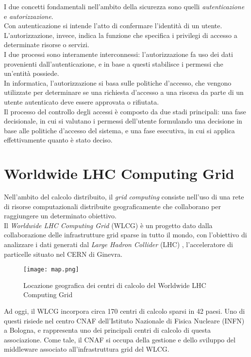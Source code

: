 I due concetti fondamentali nell'ambito della
 sicurezza sono quelli \textit{autenticazione} e \textit{autorizzazione}.
 \\ Con autenticazione si intende l'atto di confermare l'identità di un utente. 
 L'autorizzazione, invece, indica la funzione che specifica i privilegi di accesso a determinate risorse o servizi.
\\I due processi sono interamente interconnessi: l'autorizzazione fa uso dei dati provenienti 
dall'autenticazione, e in base a questi stabilisce i 
permessi che un'entità possiede.
\\ In informatica, l'autorizzazione si basa sulle politiche d'accesso, che vengono utilizzate per determinare se 
una richiesta d'accesso a una risorsa da parte di un utente autenticato deve essere approvata o rifiutata.
\\ Il processo del controllo degli accessi è composto da due stadi principali: una fase decisionale, in cui si valutano i permessi dell'utente 
 formulando una decisione in base alle politiche d'accesso del sistema,
e una fase esecutiva, in cui si applica effettivamente quanto è stato deciso. 

\section{Worldwide LHC Computing Grid}
Nell'ambito del calcolo distribuito, il \textit{grid computing} consiste 
nell'uso di una rete di risorse computazionali distribuite geograficamente che collaborano 
per raggiungere un determinato obiettivo.
\\ Il \textit{Worldwide LHC Computing Grid} (WLCG) \cite{wlcg_doc} è un progetto dato dalla collaborazione 
delle infrastrutture grid sparse in tutto il mondo, con l'obiettivo
di analizzare i dati generati dal \textit{Large Hadron Collider} (LHC) \cite{cern_lhc}, 
l'acceleratore di particelle situato nel CERN di Ginevra. 
\begin{figure}[h]
    \texttt{[image: map.png]}
    \centering
    \caption{Locazione geografica dei centri di calcolo del Worldwide LHC Computing Grid}
    \label{mappa}
\end{figure}

Ad oggi, il WLCG incorpora circa 170 centri di calcolo sparsi in 42 paesi. 
Uno di questi risiede nel centro CNAF dell'Istituto Nazionale di Fisica Nucleare (INFN) \cite{infn_cnaf} a Bologna, e
 rappresenta uno dei principali centri di calcolo di questa associazione. Come tale, il CNAF si occupa
  della gestione e dello sviluppo del middleware associato all'infrastruttura grid del WLCG. 


